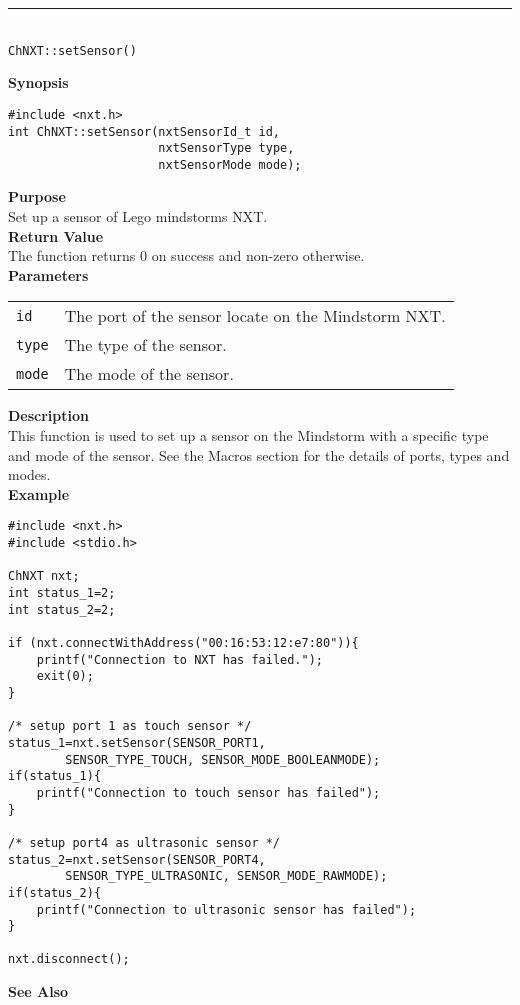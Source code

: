 \noindent
\vspace{5pt}
\rule{4.5in}{0.015in}\\
\noindent
{\LARGE \texttt{ChNXT::setSensor()} }\\


\noindent
{\bf Synopsis}
\vspace{-8pt}
\begin{verbatim}
#include <nxt.h>
int ChNXT::setSensor(nxtSensorId_t id,
                     nxtSensorType type, 
                     nxtSensorMode mode);
\end{verbatim}

\noindent
{\bf Purpose}\\
Set up a sensor of Lego mindstorms NXT.\\

\noindent
{\bf Return Value}\\
The function returns 0 on success and non-zero otherwise.\\

\noindent
{\bf Parameters}\\
\vspace{-0.1in}
\begin{description}
\item
\begin{tabular}{ p{20mm}p{135mm} }
\texttt{id}&The port of the sensor locate on the Mindstorm NXT.\\
\texttt{type}   &The type of the sensor. \\
\texttt{mode}   &The mode of the sensor. \\
\end{tabular}
\end{description}

\noindent
{\bf Description}\\
This function is used to set up a sensor on the Mindstorm with a specific type and mode of the sensor. See the Macros section for 
the details of ports, types and modes.\\

\noindent
{\bf Example}
\begin{verbatim}
#include <nxt.h> 
#include <stdio.h>

ChNXT nxt;
int status_1=2;
int status_2=2;

if (nxt.connectWithAddress("00:16:53:12:e7:80")){
    printf("Connection to NXT has failed.");
    exit(0);
}
    
/* setup port 1 as touch sensor */
status_1=nxt.setSensor(SENSOR_PORT1, 
        SENSOR_TYPE_TOUCH, SENSOR_MODE_BOOLEANMODE);
if(status_1){
    printf("Connection to touch sensor has failed");
}

/* setup port4 as ultrasonic sensor */
status_2=nxt.setSensor(SENSOR_PORT4, 
        SENSOR_TYPE_ULTRASONIC, SENSOR_MODE_RAWMODE);
if(status_2){
    printf("Connection to ultrasonic sensor has failed");
}

nxt.disconnect();
\end{verbatim}

\noindent
{\bf See Also}\\

